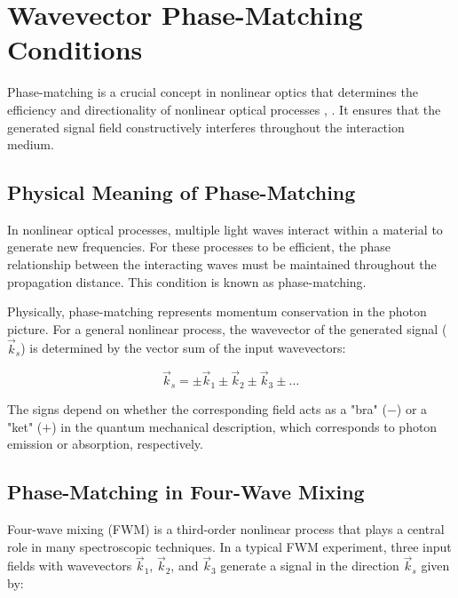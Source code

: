 \section{Wavevector Phase-Matching Conditions}
\label{sec:phase_matching}

\noindent 
Phase-matching is a crucial concept in nonlinear optics that determines the efficiency and directionality of nonlinear optical processes \cite{boyd2008contents},  . It ensures that the generated signal field constructively interferes throughout the interaction medium.


\subsection{Physical Meaning of Phase-Matching}
\label{subsec:phase_matching_meaning}

\noindent 
In nonlinear optical processes, multiple light waves interact within a material to generate new frequencies. For these processes to be efficient, the phase relationship between the interacting waves must be maintained throughout the propagation distance. This condition is known as phase-matching.

\noindent 
Physically, phase-matching represents momentum conservation in the photon picture. For a general nonlinear process, the wavevector of the generated signal ($\vec{k}_s$) is determined by the vector sum of the input wavevectors:

\begin{equation}
	\vec{k}_s = \pm\vec{k}_1 \pm\vec{k}_2 \pm\vec{k}_3 \pm \ldots
	\label{eq:phase_matching}
\end{equation}

\noindent 
The signs depend on whether the corresponding field acts as a "bra" ($-$) or a "ket" ($+$) in the quantum mechanical description, which corresponds to photon emission or absorption, respectively.


\subsection{Phase-Matching in Four-Wave Mixing}
\label{subsec:fwm_phase_matching}

\noindent 
Four-wave mixing (FWM) is a third-order nonlinear process that plays a central role in many spectroscopic techniques. In a typical FWM experiment, three input fields with wavevectors $\vec{k}_1$, $\vec{k}_2$, and $\vec{k}_3$ generate a signal in the direction $\vec{k}_s$ given by:


